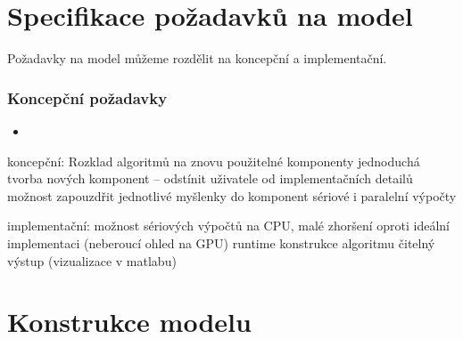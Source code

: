
\section{Specifikace požadavků na model}

Požadavky na model můžeme rozdělit na koncepční a implementační. 

\subsubsection{Koncepční požadavky}




\begin{itemize}
  \item 
\end{itemize}

koncepční:
Rozklad algoritmů na znovu použitelné komponenty
jednoduchá tvorba nových komponent -- odstínit uživatele od implementačních detailů
možnost zapouzdřit jednotlivé myšlenky do komponent
sériové i paralelní výpočty

implementační:
možnost sériových výpočtů na CPU, malé zhoršení oproti ideální implementaci (neberoucí ohled na GPU)
runtime konstrukce algoritmu
čitelný výstup (vizualizace v matlabu)

\section{Konstrukce modelu}